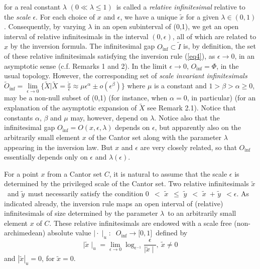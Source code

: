 \documentclass[12pt]{article}
\begin{document}
\noindent for a real constant $\lambda $ $(0\ll\lambda \leq 1)$\ is called a
{\em relative infinitesimal} relative to the {\em scale} $\epsilon $. For each choice of $x$ and $\epsilon$, we have a unique $\tilde x$ for a given $\lambda \in (0,1)$. Consequently, by varying $\lambda$ in an open subinterval of (0,1), we get an open interval of relative infinitesimals in the interval $(0,\epsilon)$, all of which are related to $x$ by the inversion formula.  The infinitesimal gap $O_{\inf}\subset \tilde I$ is, by definition, the set of these relative infinitesimals satisfying the inversion rule (\ref{eq4}), as $\epsilon\rightarrow 0$, in an asymptotic sense (c.f. Remarks 1 and  2). In the limit $\epsilon \rightarrow 0$, $O_{\inf}=\Phi$, in the usual topology. However, the corresponding set of {\em scale invariant infinitesimals} $\tilde O_{\inf}=\underset{\epsilon \rightarrow 0}{\lim} \{\tilde X |\tilde X={\frac{\tilde x}{\epsilon} \approx \mu\epsilon^{\alpha} \pm o(\epsilon^{\beta})}\}$ where $\mu$ is a constant and $1>\beta> \alpha\geq 0$, may be a non-null subset of (0,1) (for instance, when $\alpha=0$, in particular) (for an explanation of the asymptotic expansion of $\tilde X$ see Remark 2.1). Notice that constants $\alpha$, $\beta$ and $\mu$ may, however, depend on $\lambda$. Notice also that the infinitesimal gap $O_{\inf}=O(x, \epsilon, \lambda)$ depends  on  $\epsilon$, but apparently also on the arbitrarily small element $x$ of the Cantor set along with the parameter $\lambda$ appearing in the inversion law. But $x$ and $\epsilon$ are very closely related,  so that $O_{\inf}$ essentially depends only on $\epsilon$ and $\lambda(\epsilon)$.

For a point $x$ from a Cantor set $C$, it is natural to assume that the scale $\epsilon$ is determined by the privileged scale of the Cantor set. Two relative infinitesimals 
$\tilde{x}$\ and $\tilde{y}$\ must necessarily satisfy the condition $0$\ $<$
$\tilde{x}$\ $\leq $ $\tilde{y}$\ $<$ $\tilde{x}$\ $+$ $\tilde{y}$\ $
<\epsilon .$ As indicated already, the inversion rule maps an open interval of (relative) infinitesimals of size determined by the parameter $\lambda $\ to an arbitrarily small element $x$ of $C$. These
relative infinitesimals are endowed with a scale free (non-archimedean)
absolute value $\mid \cdot \mid_u :$ $\ O_{\inf }\rightarrow \lbrack 0,1]$\
defined by
\begin{equation}\label{eq5}
\mid \tilde{x}\mid_u = \underset{\epsilon \rightarrow 0}{\lim }\log
_{\epsilon ^{-1}}{\frac{\epsilon }{\mid \tilde{x}\mid }}, \  \tilde{x}%
\neq 0 
\end{equation}
\noindent and $|\tilde x|_u=0$, for $\tilde{x}=0$. 
\end{document}
